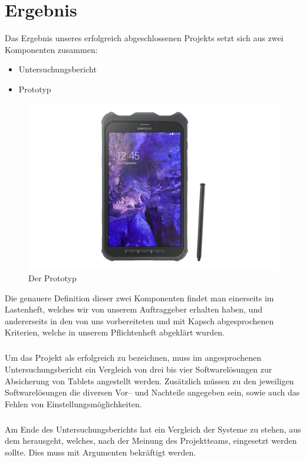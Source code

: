 \chapter{Ergebnis}
Das Ergebnis unseres erfolgreich abgeschlossenen Projekts setzt sich aus zwei Komponenten zusammen:
\begin{itemize}
	\item Untersuchungsbericht
	\item Prototyp
\end{itemize}
\begin{figure}[H]
\centering
\includegraphics[scale=1.0]{Images/prototyp}
\caption{Der Prototyp}
\end{figure}
Die genauere Definition dieser zwei Komponenten findet man einerseits im Lastenheft, welches wir von unserem Auftraggeber erhalten haben, und andererseits in den von uns vorbereiteten und mit Kapsch abgesprochenen Kriterien, welche in unserem Pflichtenheft abgeklärt wurden. 
\paragraph*{}
Um das Projekt als erfolgreich zu bezeichnen, muss im angesprochenen Untersuchungsbericht ein Vergleich von drei bis vier Softwarelösungen zur Absicherung von Tablets angestellt werden. Zusätzlich müssen zu den jeweiligen Softwarelösungen die diversen Vor– und Nachteile angegeben sein, sowie auch das Fehlen von Einstellungsmöglichkeiten.
\paragraph*{}
Am Ende des Untersuchungsberichts hat ein Vergleich der Systeme zu stehen, aus dem herausgeht, welches, nach der Meinung des Projektteams, eingesetzt werden sollte. Dies muss mit Argumenten bekräftigt werden.

